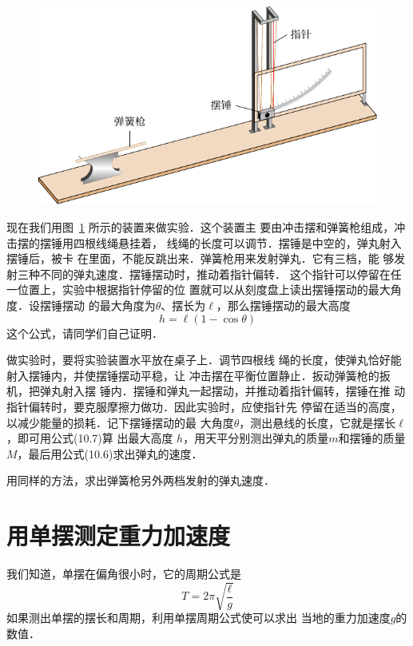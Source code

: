 \begin{figure}[htbp]
    \centering
    \includegraphics{fig/A/10-21.pdf}
    \caption{}\label{fig_A_10-21}
\end{figure}

现在我们用图~\ref{fig_A_10-21} 所示的装置来做实验．这个装置主
要由冲击摆和弹簧枪组成，冲击摆的摆锤用四根线绳悬挂着，
线绳的长度可以调节．摆锤是中空的，弹丸射入摆锤后，被卡
在里面，不能反跳出来．弹簧枪用来发射弹丸．它有三档，能
够发射三种不同的弹丸速度．摆锤摆动时，推动着指针偏转．
这个指针可以停留在任一位置上，实验中根据指针停留的位
置就可以从刻度盘上读出摆锤摆动的最大角度．设摆锤摆动	
的最大角度为$\theta$、摆长为$\ell$，那么摆锤摆动的最大高度
\begin{equation}
    h=\ell(1-\cos\theta)
\end{equation}
这个公式，请同学们自己证明．

做实验时，要将实验装置水平放在桌子上．调节四根线
绳的长度，使弹丸恰好能射入摆锤内，并使摆锤摆动平稳，让
冲击摆在平衡位置静止．扳动弹簧枪的扳机，把弹丸射入摆
锤内．摆锤和弹丸一起摆动，并推动着指针偏转，摆锤在推
动指针偏转时，要克服摩擦力做功．因此实验时，应使指针先
停留在适当的高度，以减少能量的损耗．记下摆锤摆动的最
大角度$\theta$，测出悬线的长度，它就是摆长$\ell$，即可用公式(10.7)算
出最大高度 $h$，用天平分别测出弹丸的质量$m$和摆锤的质量
$M$，最后用公式(10.6)求出弹丸的速度．

用同样的方法，求出弹簧枪另外两档发射的弹丸速度．

\section{用单摆测定重力加速度}
我们知道，单摆在偏角很小时，它的周期公式是
\[T=2\pi\sqrt{\frac{\ell}{g}}  \]
如果测出单摆的摆长和周期，利用单摆周期公式使可以求出
当地的重力加速度$g$的数值．

